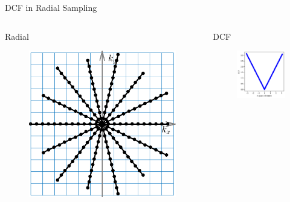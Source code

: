 \begin{frame}{DCF in Radial Sampling}

    \begin{columns}
	\begin{column}{0.35\textwidth}
		\centering
		Radial
		\begin{figure}
			\includegraphics[width=\columnwidth]{fig/mri-trj-radial.png}
		\end{figure}
	\end{column}

	\begin{column}{0.35\textwidth}
		\centering
		DCF
		\begin{figure}
			\includegraphics[width=\columnwidth]{fig/dcf.png}
		\end{figure}
	\end{column}
	\end{columns}


\end{frame}
